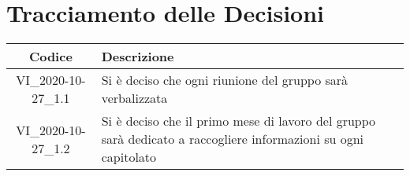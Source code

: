 \section*{Tracciamento delle Decisioni}

\begin{center}
	\begin{longtable}{|c|p{14.5cm}|}
	\hline
	\rowcolor{lighter-grayer}
	\textbf{Codice} & \textbf{Descrizione} \\
	\hline
	\endfirsthead

	\hline
	VI\_2020-10-27\_1.1 & Si è deciso che ogni riunione del gruppo sarà verbalizzata  \\
	\hline
	VI\_2020-10-27\_1.2 & Si è deciso che il primo mese di lavoro del gruppo sarà dedicato a raccogliere informazioni su ogni capitolato  \\
	\hline

	\end{longtable}
\end{center}